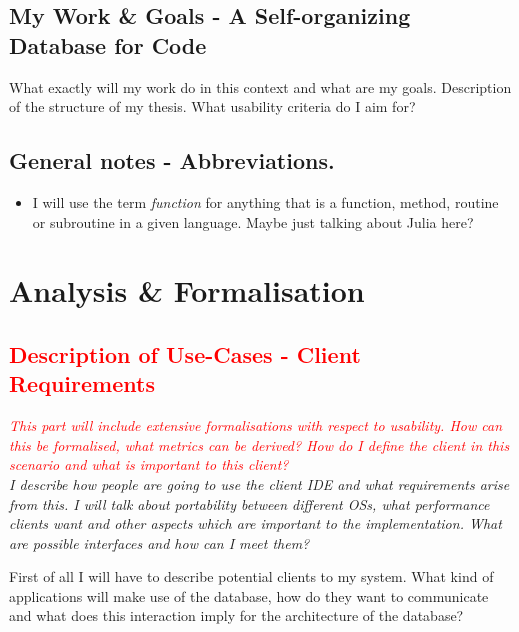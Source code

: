 \documentclass[12p]{scrartcl}
\begin{document}
\subsection{My Work \& Goals - A Self-organizing Database for Code}
What exactly will my work do in this context and what are my goals. 
Description of the structure of my thesis. What usability criteria do I aim for?\\

\subsection*{General notes - Abbreviations.}
\begin{itemize}
	\item I will use the term \textit{function} for anything that is a function, method, routine or subroutine in a given language. Maybe just talking about Julia here?
\end{itemize}



\section{Analysis \& Formalisation}
\label{sec:analysis}

\subsection{\textcolor{red}{Description of Use-Cases - Client Requirements}}
\label{sec:clientReq}
\textit{\textcolor{red}{This part will include extensive formalisations with respect to usability. How can this be formalised, what metrics can be derived? How do I define the client in this scenario and what is important to this client?}\\
I describe how people are going to use the client IDE and what requirements arise from this. I will talk about portability between different OSs, what performance clients want and other aspects which are important to the implementation. What are possible interfaces and how can I meet them?}

First of all I will have to describe potential clients to my system. What kind of applications will make use of the database, how do they want to communicate and what does this interaction imply for the architecture of the database?
\end{document}

